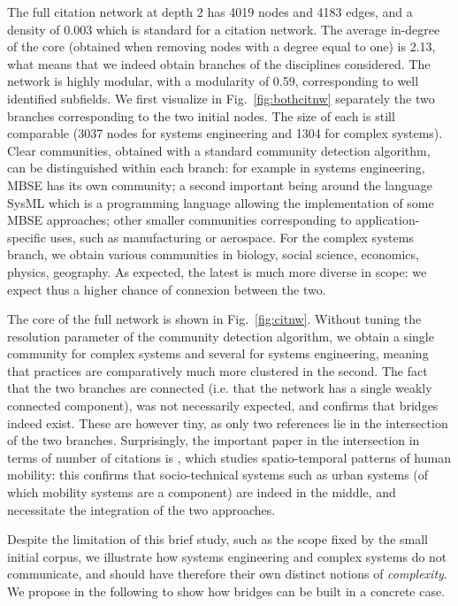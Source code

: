 \documentclass[runningheads,a4paper]{llncs2e/llncs}
\begin{document}
The full citation network at depth 2 has 4019 nodes and 4183 edges, and a density of 0.003 which is standard for a citation network. The average in-degree of the core (obtained when removing nodes with a degree equal to one) is 2.13, what means that we indeed obtain branches of the disciplines considered. The network is highly modular, with a modularity of 0.59, corresponding to well identified subfields. We first visualize in Fig.~\ref{fig:bothcitnw} separately the two branches corresponding to the two initial nodes. The size of each is still comparable (3037 nodes for systems engineering and 1304 for complex systems). Clear communities, obtained with a standard community detection algorithm, can be distinguished within each branch: for example in systems engineering, MBSE has its own community; a second important being around the language SysML which is a programming language allowing the implementation of some MBSE approaches; other smaller communities corresponding to application-specific uses, such as manufacturing or aerospace. For the complex systems branch, we obtain various communities in biology, social science, economics, physics, geography. As expected, the latest is much more diverse in scope: we expect thus a higher chance of connexion between the two.

The core of the full network is shown in Fig.~\ref{fig:citnw}. Without tuning the resolution parameter of the community detection algorithm, we obtain a single community for complex systems and several for systems engineering, meaning that practices are comparatively much more clustered in the second. The fact that the two branches are connected (i.e. that the network has a single weakly connected component), was not necessarily expected, and confirms that bridges indeed exist. These are however tiny, as only two references lie in the intersection of the two branches. Surprisingly, the important paper in the intersection in terms of number of citations is \cite{hasan2013spatiotemporal}, which studies spatio-temporal patterns of human mobility: this confirms that socio-technical systems such as urban systems (of which mobility systems are a component) are indeed in the middle, and necessitate the integration of the two approaches.

Despite the limitation of this brief study, such as the scope fixed by the small initial corpus, we illustrate how systems engineering and complex systems do not communicate, and should have therefore their own distinct notions of \emph{complexity}. We propose in the following to show how bridges can be built in a concrete case.
\end{document}
